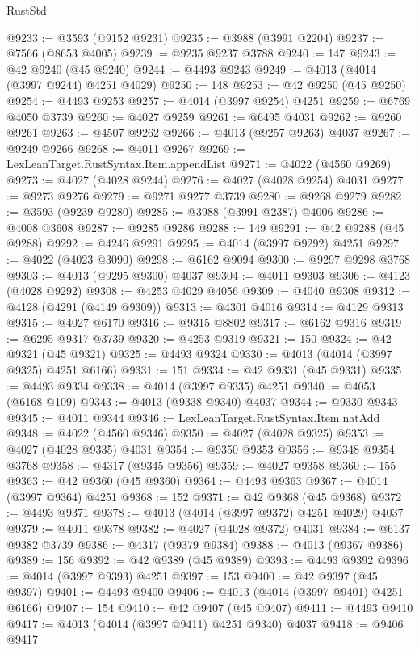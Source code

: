 \begin{lexlean}{RustStd}
\begin{coremodule}
@9233 := @3593 (@9152 @9231)
@9235 := @3988 (@3991 @2204)
@9237 := @7566 (@8653 @4005)
@9239 := @9235 @9237 @3788
@9240 := 147
@9243 := @42 @9240 (@45 @9240)
@9244 := @4493 @9243
@9249 := @4013 (@4014 (@3997 @9244) @4251 @4029)
@9250 := 148
@9253 := @42 @9250 (@45 @9250)
@9254 := @4493 @9253
@9257 := @4014 (@3997 @9254) @4251
@9259 := @6769 @4050 @3739
@9260 := @4027 @9259
@9261 := @6495 @4031
@9262 := @9260 @9261
@9263 := @4507 @9262
@9266 := @4013 (@9257 @9263) @4037
@9267 := @9249 @9266
@9268 := @4011 @9267
@9269 := LexLeanTarget.RustSyntax.Item.appendList
@9271 := @4022 (@4560 @9269)
@9273 := @4027 (@4028 @9244)
@9276 := @4027 (@4028 @9254) @4031
@9277 := @9273 @9276
@9279 := @9271 @9277 @3739
@9280 := @9268 @9279
@9282 := @3593 (@9239 @9280)
@9285 := @3988 (@3991 @2387) @4006
@9286 := @4008 @3608
@9287 := @9285 @9286
@9288 := 149
@9291 := @42 @9288 (@45 @9288)
@9292 := @4246 @9291
@9295 := @4014 (@3997 @9292) @4251
@9297 := @4022 (@4023 @3090)
@9298 := @6162 @9094
@9300 := @9297 @9298 @3768
@9303 := @4013 (@9295 @9300) @4037
@9304 := @4011 @9303
@9306 := @4123 (@4028 @9292)
@9308 := @4253 @4029 @4056
@9309 := @4040 @9308
@9312 := @4128 (@4291 (@4149 @9309))
@9313 := @4301 @4016
@9314 := @4129 @9313
@9315 := @4027 @6170
@9316 := @9315 @8802
@9317 := @6162 @9316
@9319 := @6295 @9317 @3739
@9320 := @4253 @9319
@9321 := 150
@9324 := @42 @9321 (@45 @9321)
@9325 := @4493 @9324
@9330 := @4013 (@4014 (@3997 @9325) @4251 @6166)
@9331 := 151
@9334 := @42 @9331 (@45 @9331)
@9335 := @4493 @9334
@9338 := @4014 (@3997 @9335) @4251
@9340 := @4053 (@6168 @109)
@9343 := @4013 (@9338 @9340) @4037
@9344 := @9330 @9343
@9345 := @4011 @9344
@9346 := LexLeanTarget.RustSyntax.Item.natAdd
@9348 := @4022 (@4560 @9346)
@9350 := @4027 (@4028 @9325)
@9353 := @4027 (@4028 @9335) @4031
@9354 := @9350 @9353
@9356 := @9348 @9354 @3768
@9358 := @4317 (@9345 @9356)
@9359 := @4027 @9358
@9360 := 155
@9363 := @42 @9360 (@45 @9360)
@9364 := @4493 @9363
@9367 := @4014 (@3997 @9364) @4251
@9368 := 152
@9371 := @42 @9368 (@45 @9368)
@9372 := @4493 @9371
@9378 := @4013 (@4014 (@3997 @9372) @4251 @4029) @4037
@9379 := @4011 @9378
@9382 := @4027 (@4028 @9372) @4031
@9384 := @6137 @9382 @3739
@9386 := @4317 (@9379 @9384)
@9388 := @4013 (@9367 @9386)
@9389 := 156
@9392 := @42 @9389 (@45 @9389)
@9393 := @4493 @9392
@9396 := @4014 (@3997 @9393) @4251
@9397 := 153
@9400 := @42 @9397 (@45 @9397)
@9401 := @4493 @9400
@9406 := @4013 (@4014 (@3997 @9401) @4251 @6166)
@9407 := 154
@9410 := @42 @9407 (@45 @9407)
@9411 := @4493 @9410
@9417 := @4013 (@4014 (@3997 @9411) @4251 @9340) @4037
@9418 := @9406 @9417

\end{coremodule}
\end{lexlean}
